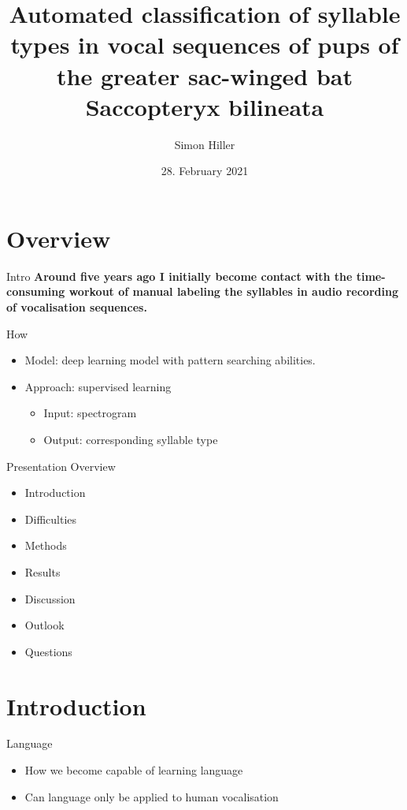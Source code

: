 \documentclass[10pt]{beamer}
\title[Master Thesis]{Automated classification of syllable types in vocal sequences of pups of the greater sac-winged bat Saccopteryx bilineata}
\author{Simon Hiller}
\institute{Andreas Fischer \&
Daniel Wegmann

University of Bern - Fribourg}
\date{28. February 2021}
\begin{document}
\begin{frame}
  \titlepage
\end{frame}


\section{Overview}

\begin{frame}{Intro}
\textbf{Around five years ago I initially become contact with the time-consuming workout of manual labeling the syllables in audio recording of vocalisation sequences.}
\end{frame}

\begin{frame}{How}
\begin{itemize}
\item Model: deep learning model with pattern searching abilities.
\item Approach: supervised learning
\begin{itemize}
\item Input: spectrogram
\item Output: corresponding syllable type
\end{itemize}
\end{itemize}
\end{frame}

\begin{frame}{Presentation Overview}
\begin{itemize}
\item Introduction
\item Difficulties
\item Methods
\item Results
\item Discussion
\item Outlook
\item Questions
\end{itemize}
\end{frame}

\section{Introduction}
\begin{frame}{Language}
\begin{itemize}
\item How we become capable of learning language
\item Can language only be applied to human vocalisation
\end{itemize}
\end{frame}
\end{document}
